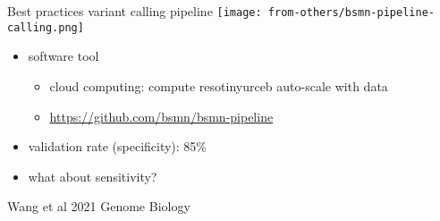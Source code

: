 \documentclass[usenames,dvipsnames]{beamer}
\begin{document}
\begin{frame}{Best practices variant calling pipeline}
\texttt{[image: from-others/bsmn-pipeline-calling.png]}
\begin{center}
\begin{itemize}
\item software tool
\begin{itemize}
        \item cloud computing: compute resotinyurceb auto-scale with data
	\item  \url{https://github.com/bsmn/bsmn-pipeline}
\end{itemize}
\item validation rate (specificity): 85\%
\item what about sensitivity?
\end{itemize}
\end{center}

{\tiny Wang et al 2021 Genome Biology}
\end{frame}
\end{document}
